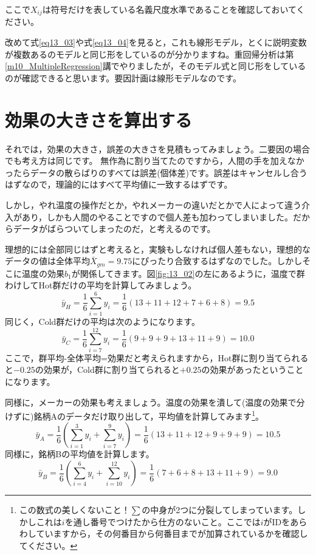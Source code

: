 \documentclass{ltjbook}
\begin{document}
ここで$X_{ij}$は符号だけを表している名義尺度水準であることを確認しておいてください。

改めて式\ref{eq13_03}や式\ref{eq13_04}を見ると，これも線形モデル，とくに説明変数が複数あるのモデルと同じ形をしているのが分かりますね。重回帰分析は第\ref{m10_MultipleRegression}講でやりましたが，そのモデル式と同じ形をしているのが確認できると思います。要因計画は線形モデルなのです。


\section{効果の大きさを算出する}

それでは，効果の大きさ，誤差の大きさを見積もってみましょう。二要因の場合でも考え方は同じです。
無作為に割り当てたのですから，人間の手を加えなかったらデータの散らばりのすべては誤差(個体差)です。誤差はキャンセルし合うはずなので，理論的にはすべて平均値に一致するはずです。

しかし，やれ温度の操作だとか，やれメーカーの違いだとかで人によって違う介入があり，しかも人間のやることですので個人差も加わってしまいました。だからデータがばらついてしまったのだ，と考えるのです。

理想的には全部同じはずと考えると，実験もしなければ個人差もない，理想的なデータの値は全体平均$\bar{X}_{gm} = 9.75$にぴったり合致するはずなのでした。しかしそこに温度の効果$b_1$が関係してきます。図\ref{fig:13_02}の左にあるように，温度で群わけしてHot群だけの平均を計算してみましょう。
\[ \bar{y}_{H} = \frac{1}{6}\sum_{i=1}^6 y_i = \frac{1}{6} (13+11+12+7+6+8)= 9.5 \]
同じく，Cold群だけの平均は次のようになります。
\[ \bar{y}_{C} = \frac{1}{6}\sum_{i=7}^{12}y_i = \frac{1}{6}(9+9+9+13+11+9) = 10.0 \]
ここで，群平均-全体平均=効果だと考えられますから，Hot群に割り当てられると$-0.25$の効果が，Cold群に割り当てられると$+0.25$の効果があったということになります。

同様に，メーカーの効果も考えましょう。温度の効果を潰して(温度の効果で分けずに)銘柄Aのデータだけ取り出して，平均値を計算してみます\footnote{この数式の美しくないこと！$\sum$の中身が2つに分裂してしまっています。しかしこれは$i$を通し番号でつけたから仕方のないこと。ここでは$i$がIDをあらわしていますから，その何番目から何番目までが加算されているかを確認してください。}。
\[ \bar{y}_{A} = \frac{1}{6}\left(\sum_{i=1}^3y_{i} + \sum_{i=7}^9y_i \right)= \frac{1}{6}(13+11+12+9+9+9) = 10.5 \]
同様に，銘柄Bの平均値を計算します。
\[ \bar{y}_{B} = \frac{1}{6}\left(\sum_{i=4}^6y_i + \sum_{i=10}^{12}y_i \right) =\frac{1}{6}(7+6+8+13+11+9)= 9.0 \]
\end{document}
